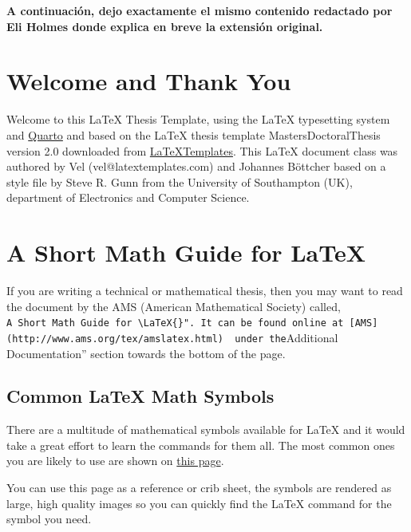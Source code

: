 \documentclass[
  letterpaper,
  11pt,
  spanish,
  singlespacing,
  headsepline]{MastersDoctoralThesis}
\begin{document}
\textbf{A continuación, dejo exactamente el mismo contenido redactado
por Eli Holmes donde explica en breve la extensión original.}

\hypertarget{welcome-and-thank-you}{%
\section{Welcome and Thank You}\label{welcome-and-thank-you}}

Welcome to this \LaTeX{} Thesis Template, using the \LaTeX{} typesetting
system and \href{quarto.org}{Quarto} and based on the \LaTeX{} thesis
template MastersDoctoralThesis version 2.0 downloaded from
\href{http://www.LaTeXTemplates.com}{LaTeXTemplates}. This LaTeX
document class was authored by Vel (vel@latextemplates.com) and Johannes
Böttcher based on a style file by Steve R. Gunn from the University of
Southampton (UK), department of Electronics and Computer Science.

\hypertarget{a-short-math-guide-for}{%
\section{\texorpdfstring{A Short Math Guide for
\LaTeX{}}{A Short Math Guide for }}\label{a-short-math-guide-for}}

If you are writing a technical or mathematical thesis, then you may want
to read the document by the AMS (American Mathematical Society) called,
\texttt{A\ Short\ Math\ Guide\ for\ \textbackslash{}LaTeX\{\}".\ It\ can\ be\ found\ online\ at\ {[}AMS{]}(http://www.ams.org/tex/amslatex.html)\ \ under\ the}Additional
Documentation'' section towards the bottom of the page.

\hypertarget{common-math-symbols}{%
\subsection{\texorpdfstring{Common \LaTeX{} Math
Symbols}{Common  Math Symbols}}\label{common-math-symbols}}

There are a multitude of mathematical symbols available for \LaTeX{} and
it would take a great effort to learn the commands for them all. The
most common ones you are likely to use are shown on
\href{http://www.sunilpatel.co.uk/latex-type/latex-math-symbols/}{this
page}.

You can use this page as a reference or crib sheet, the symbols are
rendered as large, high quality images so you can quickly find the
\LaTeX{} command for the symbol you need.
\end{document}
